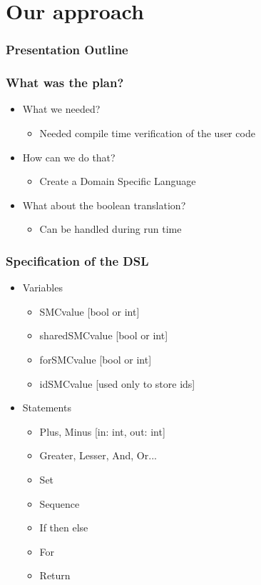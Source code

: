 \documentclass{beamer}
\begin{document}
\section{Our approach}
\begin{frame}[fragile]
\frametitle{Presentation Outline}
\tableofcontents[currentsection]
\end{frame}

\begin{frame}[fragile]
\frametitle{What was the plan?}
\begin{itemize}
\item What we needed?
\begin{itemize}
\item Needed compile time verification of the user code
\end{itemize}
\item How can we do that?
\begin{itemize}
\item Create a Domain Specific Language
\end{itemize}
\item What about the boolean translation?
\begin{itemize}
\item Can be handled during run time
\end{itemize}
\end{itemize}
\end{frame}


\begin{frame}[fragile]
\frametitle{Specification of the DSL}
\begin{itemize}
\item Variables
\begin{itemize}
\item SMCvalue [bool or int]
\item sharedSMCvalue [bool or int]
\item forSMCvalue [bool or int]
\item idSMCvalue [used only to store ids]
\end{itemize}
\item Statements
\begin{itemize}
\item Plus, Minus [in: int, out: int]
\item Greater, Lesser, And, Or...
\item Set
\item Sequence
\item If then else
\item For
\item Return
\end{itemize}
\end{itemize}
\end{frame}
\end{document}
